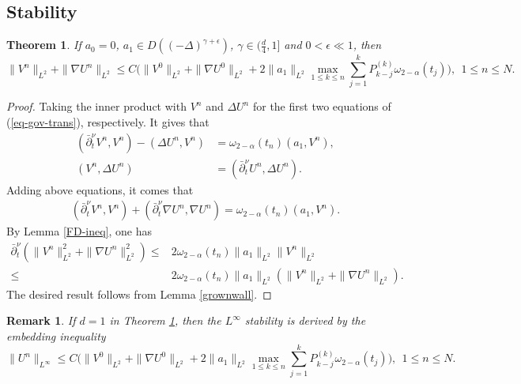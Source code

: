 \documentclass[11pt]{article}
\newtheorem{theorem}{Theorem}
\newtheorem{remark}{Remark}[section]
\numberwithin{equation}{section}
\begin{document}
\subsection{Stability}
\begin{theorem}\label{thm-stab-1}
If $a_0=0$, $a_1\in D((-\Delta)^{\gamma+\epsilon})$, $\gamma\in(\frac{d}{4},1]$ and $0<\epsilon \ll 1$, then
\[
\|V^n\|_{L^2}+\|\nabla U^n\|_{L^2} \leq C\bigg(\|V^0\|_{L^2}+\|\nabla U^0\|_{L^2}+2\|a_1\|_{L^2}\max_{1\le k\le n}\sum_{j=1}^kP_{k-j}^{(k)}\omega_{2-\alpha}(t_j)\bigg),~~1\le n\le N.
\]
\end{theorem}
\begin{proof}
Taking the inner product with $V^n$ and $\Delta U^n$ for the first two equations of (\ref{eq-gov-trans}), respectively. It gives that
\begin{align*}
(\bar\partial_t^\nu V^n,V^n) - (\Delta U^n,V^n) &= \omega_{2-\alpha}(t_n)(a_1,V^n), \\
(V^n,\Delta U^n)  &= (\bar\partial_t^\nu U^n,\Delta U^n). 
\end{align*}
Adding above equations, it comes that
\begin{align*}
(\bar\partial_t^\nu V^n,V^n) + (\bar\partial_t^\nu \nabla U^n,\nabla U^n) = \omega_{2-\alpha}(t_n)(a_1,V^n).
\end{align*}
By Lemma \ref{FD-ineq}, one has
\begin{align*}
\bar\partial_t^\nu (\|V^n\|_{L^2}^2 + \|\nabla U^n\|_{L^2}^2) 
\le& 2\omega_{2-\alpha}(t_n)\|a_1\|_{L^2}\|V^n\|_{L^2}\\
\le& 2\omega_{2-\alpha}(t_n)\|a_1\|_{L^2}(\|V^n\|_{L^2}+\|\nabla U^n\|_{L^2}).
\end{align*}
The desired result follows from Lemma \ref{grownwall}.
\end{proof}

\begin{remark}
If $d=1$ in Theorem \ref{thm-stab-1}, then the $L^\infty$ stability is derived by the embedding inequality
\[
\|U^n\|_{L^\infty} \leq C\bigg(\|V^0\|_{L^2}+\|\nabla U^0\|_{L^2}+2\|a_1\|_{L^2}\max_{1\le k\le n}\sum_{j=1}^kP_{k-j}^{(k)}\omega_{2-\alpha}(t_j)\bigg),~~1\le n\le N.
\]
\end{remark}
\end{document}
